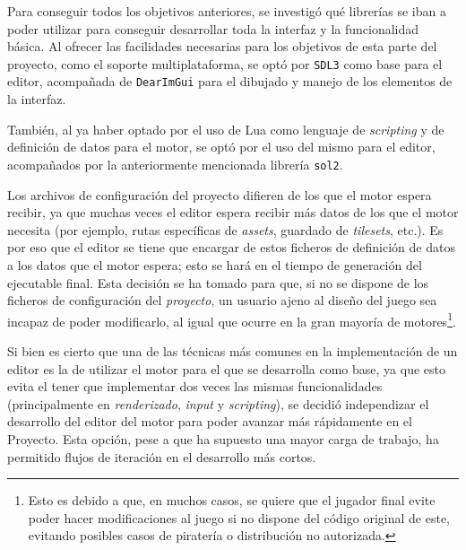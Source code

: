 Para conseguir todos los objetivos anteriores, se investigó qué librerías se iban a poder utilizar para conseguir desarrollar toda la interfaz y la funcionalidad básica. Al ofrecer las facilidades necesarias para los objetivos de esta parte del proyecto, como el soporte multiplataforma, se optó por \texttt{SDL3} como base para el editor, acompañada de \texttt{DearImGui} para el dibujado y manejo de los elementos de la interfaz.

\medskip

También, al ya haber optado por el uso de Lua como lenguaje de \textit{scripting} y de definición de datos para el motor, se optó por el uso del mismo para el editor, acompañados por la anteriormente mencionada librería \texttt{sol2}.

\smallskip

Los archivos de configuración del proyecto difieren de los que el motor espera recibir, ya que muchas veces el editor espera recibir más datos de los que el motor necesita (por ejemplo, rutas específicas de \textit{assets}, guardado de \textit{tilesets}, etc.). Es por eso que el editor se tiene que encargar de  estos ficheros de definición de datos a los datos que el motor espera; esto se hará en el tiempo de generación del ejecutable final. Esta decisión se ha tomado para que, si no se dispone de los ficheros de configuración del \textit{proyecto}, un usuario ajeno al diseño del juego sea incapaz de poder modificarlo, al igual que ocurre en la gran mayoría de motores\footnote{Esto es debido a que, en muchos casos, se quiere que el jugador final evite poder hacer modificaciones al juego si no dispone del código original de este, evitando posibles casos de piratería o distribución no autorizada.}.

\medskip

Si bien es cierto que una de las técnicas más comunes en la implementación de un editor es la de utilizar el motor para el que se desarrolla como base, ya que esto evita el tener que implementar dos veces las mismas funcionalidades (principalmente en \textit{renderizado}, \textit{input} y \textit{scripting}), se decidió independizar el desarrollo del editor del motor para poder avanzar más rápidamente en el Proyecto. Esta opción, pese a que ha supuesto una mayor carga de trabajo, ha permitido flujos de iteración en el desarrollo más cortos.
